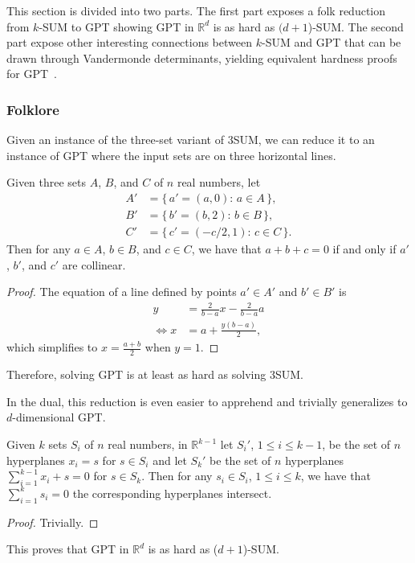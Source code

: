 This section is divided into two parts.
%
The first part exposes a folk reduction from \(k\)-SUM to GPT showing
GPT in \(\mathbb{R}^d\) is as hard as \((d+1\))-SUM.
%
The second part expose other interesting connections between \(k\)-SUM and GPT
that can be drawn through Vandermonde determinants, yielding equivalent
hardness proofs for GPT~\cite{Er99b}.


\subsubsection{Folklore}

Given an instance of the three-set variant of 3SUM,
we can reduce it to an instance of GPT where the input sets are on three
horizontal lines.
%
\begin{lemma}
Given three sets \(A\), \(B\), and \(C\) of \(n\) real numbers, let
\begin{align*}
    A' &= \{\, a' = (a,0) \colon\, a \in A\,\},\\
    B' &= \{\, b' = (b,2) \colon\, b \in B\,\},\\
    C' &= \{\, c' = (-c/2,1) \colon\, c \in C\,\}.
\end{align*}
Then for any \(a \in A\), \(b \in B\), and \(c \in C\), we have that
\(a+b+c=0\) if and only if \(a'\), \(b'\), and \(c'\) are collinear.
\end{lemma}
%
\begin{proof}
    The equation of a line defined by points \(a' \in A'\) and \(b' \in B'\)
    is
    \begin{align*}
	y &= \frac{2}{b-a} x - \frac{2}{b-a} a\\
	\iff x &= a + \frac{y (b-a)}{2},
    \end{align*}
    which simplifies to \(x = \frac{a+b}{2}\) when \(y = 1\).
\end{proof}

Therefore, solving GPT is at least as hard as solving 3SUM.

In the dual, this reduction is even easier to apprehend and trivially
generalizes to \(d\)-dimensional GPT.
%
\begin{lemma}
Given \(k\) sets \(S_i\) of \(n\) real numbers,
in \(\mathbb{R}^{k-1}\)
let
\(S_i'\), \(1 \leq i \leq k-1\),
be the set of \(n\) hyperplanes \(x_i = s\) for \(s \in S_i\) and let
\(S_k'\) be the set of \(n\) hyperplanes \(\sum_{i=1}^{k-1} x_i + s = 0\) for
\(s \in S_k\).
Then for any \(s_i \in S_i\), \(1 \leq i \leq k\),
we have that
\(\sum_{i=1}^{k} s_i = 0\)
the corresponding hyperplanes intersect.
\end{lemma}
%
\begin{proof}
    Trivially.
\end{proof}
%
This proves that GPT in \(\mathbb{R}^d\) is as hard as (\(d+1\))-SUM.

